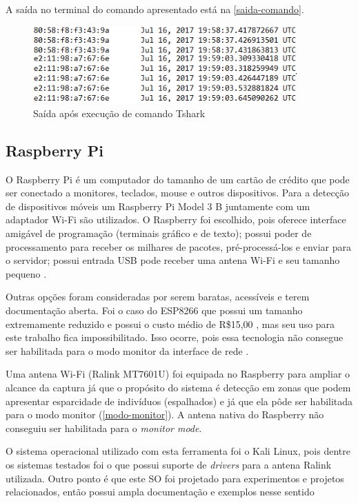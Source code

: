 A saída no terminal do comando apresentado está na \autoref{saida-comando}.

\begin{figure}[htb]
  \caption{\label{saida-comando}Saída após execução de comando Tshark}
  \begin{center}
    \includegraphics[width=0.90\textwidth]{img/packets.png}
  \end{center}
\end{figure}

\subsection{Raspberry Pi}
O Raspberry Pi é um computador do tamanho de um cartão de crédito que pode ser conectado a monitores, teclados, mouse e outros dispositivos.
Para a detecção de dispositivos móveis um Raspberry Pi Model 3 B juntamente com um adaptador Wi-Fi são utilizados. O Raspberry foi escolhido,
pois oferece interface amigável de programação (terminais gráfico e de texto); possui poder de processamento para receber os milhares de pacotes, pré-processá-los
e enviar para o servidor; possui entrada USB pode receber uma antena Wi-Fi e seu tamanho pequeno \cite{rpi2017}.

Outras opções foram consideradas por serem baratas, acessíveis e terem documentação aberta. Foi o caso do ESP8266 que possui um tamanho extremamente
reduzido e possui o custo médio de R\$15,00 \cite{Embarcados2015}, mas seu uso para este trabalho fica impossibilitado. Isso
ocorre, pois essa tecnologia não consegue ser habilitada para o modo monitor da interface de rede \cite{Puhl2016} \cite{Ferreira2016}.

Uma antena Wi-Fi (Ralink MT7601U) foi equipada no Raspberry para ampliar o alcance da captura já que o propósito do sistema é detecção em zonas que podem
apresentar esparcidade de indivíduos (espalhados) e já que ela pôde ser habilitada para o modo monitor (\autoref{modo-monitor}). A antena nativa
do Raspberry não conseguiu ser habilitada para o \emph{monitor mode}.

O sistema operacional utilizado com esta ferramenta foi o Kali Linux, pois dentre os sistemas testados foi o que possui suporte de \emph{drivers} para a antena Ralink utilizada. Outro ponto é que este SO foi projetado
para experimentos e projetos relacionados, então possui ampla documentação e exemplos nesse sentido \cite{kali}

